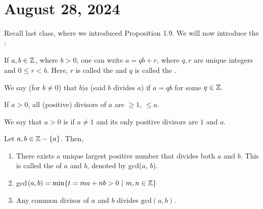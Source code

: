 \documentclass[12pt]{scrartcl}
\begin{document}
\section{August 28, 2024}
Recall last class, where we introduced Proposition 1.9. We will now introduce the :

\begin{theorem}
    If $a, b \in \mathbb Z$, where $b > 0$, one can write $a = qb + r$, where $q, r$ are unique integers and $0 \leq r < b$. Here, $r$ is called the  and $q$ is called the .
\end{theorem}

\begin{definition}
    We say (for $b \neq 0$) that $b|a$ (said $b$ divides $a$) if $a = qb$ for some $q \in \mathbb Z$.
\end{definition}

\begin{remark}
    If $a > 0$, all (positive) divisors of $a$ are $\geq 1$, $\leq a$.
\end{remark}

\begin{definition}
    We say that $a > 0$ is  if $a \neq 1$ and its only positive divisors are $1$ and $a$.
\end{definition}

\begin{theorem}
    Let $a, b \in \mathbb Z - \{a\}$. Then,
        \begin{enumerate}
            \item There exists a unique largest positive number that divides both $a$ and $b$. This is called the  of $a$ and $b$, denoted by gcd($a$, $b$).

            \item gcd$(a, b) = \min\{t = ma + nb > 0 \ | \ m, n \in \ZZ\}$

            \item Any common divisor of $a$ and $b$ divides $\text{gcd}(a, b)$.
        \end{enumerate}
\end{theorem}
\end{document}
